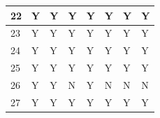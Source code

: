 \begin{table}[H]
\begin{tabular}{|l|l|l|l|l|l|l|l|}
22              & Y                                                              & Y                                                              & Y                                                             & Y                                                              & Y                                                             & Y                                                             & Y                                                             \\ \hline
23              & Y                                                              & Y                                                              & Y                                                             & Y                                                              & Y                                                             & Y                                                             & Y                                                             \\ \hline
24              & Y                                                              & Y                                                              & Y                                                             & Y                                                              & Y                                                             & Y                                                             & Y                                                             \\ \hline
25              & Y                                                              & Y                                                              & Y                                                             & Y                                                              & Y                                                             & Y                                                             & Y                                                             \\ \hline
26              & Y                                                              & Y                                                              & N                                                             & Y                                                              & N                                                             & N                                                             & N                                                             \\ \hline
27              & Y                                                              & Y                                                              & Y                                                             & Y                                                              & Y                                                             & Y                                                             & Y                                                             \\ \hline

\end{tabular}
\end{table}
